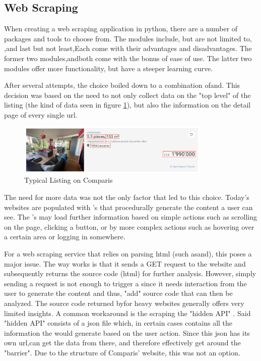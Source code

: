\documentclass[main]{subfiles}
\begin{document}
\subsection{Web Scraping}

When creating a web scraping application in python, there are a number of packages and tools to choose from.
The modules include, but are not limited to\pkg[requests]\hspace*{-10pt},
\pkg[BeautifulSoup],\pkg[Scrapy]and last but not least,\pkg[Selenium.]
Each come with their advantages and disadvantages. 
The former two modules,\pkg[requests] and\pkg[BeautifulSoup] both come with the bonus of ease of use.
The latter two modules offer more functionality, but have a steeper learning curve.

After several attempts, the choice boiled down to a combination of\pkg[Selenium] and\pkg[Scrapy].
This decision was based on the need to not only collect data on the "top level" of the listing
(the kind of data seen in figure \ref{fig:listing}), 
but also the information on the detail page of every single \acs*{url}.

\begin{figure}[htbp]
    \centerline{
        \includegraphics[width = 92mm]{prog_1.png}}
    \caption{Typical Listing on Comparis}
    \label{fig:listing}
\end{figure}

The need for more data was not the only factor that led to this choice.
Today's websites are populated with \js's that procedurally generate the content a user can see.
The \js's may load further information based on simple actions such as scrolling on the page,
clicking a button, or by more complex actions such as hovering over a certain area or logging in somewhere.

For a web scraping service that relies on parsing \acs*{html} (such as\pkg[requests] and\pkg[BeautifulSoup]), 
this poses a major issue.
The way\pkg[requests]\hspace{-5pt} works is that it sends a GET request to the website and subsequently returns the source code (\acs*{html}) for further analysis.
However, simply sending a request is not enough to trigger a \js since it needs interaction from the user to generate the content and thus, 
"add" source code that can then be analyzed.
The source code returned by\pkg[requests] for \js heavy websites generally offers very limited insights.
A common workaround is the scraping the "hidden API" \cite{eWebScrapingBeginners2019}  \cite{johnwatsonrooneyAlwaysCheckHidden2021}.
Said "hidden API" consists of a \acs*{json} file which, in certain cases contains all the information the \js would generate based on the user action.
Since this  \acs*{json} has its own \acs*{url},\pkg[requests] \hspace{-3pt}can get the data from there, 
and therefore effectively get around the "\js barrier".
Due to the structure of Comparis' website, this was not an option.
\end{document}
